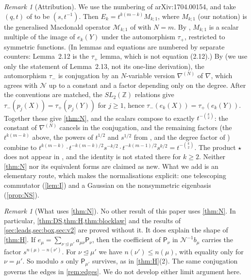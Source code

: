 \documentclass[11pt]{amsart}
\theoremstyle{definition}
\theoremstyle{remark}
\newtheorem{remark}[theorem]{Remark}
\numberwithin{equation}{section}
\begin{document}
\begin{remark}[Attribution]\label{rem:N-DFK}
We use the numbering of arXiv:1704.00154, and take $(q,t)$ of \cite{DFK19} to be $(s,t^{-1})$. Then $E_k=t^{k(m-k)}M_{k;1}$, where $M_{k;1}$ (our notation) is the generalised Macdonald operator $\mathcal M_{k;1}$ of \cite[(1.5)]{DFK19} with $N=m$. By \cite[Lemma~2.12, Lemma~2.16, Thm.~2.17]{DFK19}, $M_{k;1}$ is a scalar multiple of the image of $e_k(Y)$ under the automorphism $\tau_+$, restricted to symmetric functions. (In \cite{DFK19} lemmas and equations are numbered by separate counters: Lemma~2.12 is the $\tau_+$ lemma, which is not equation (2.12).) By \cite[Lemma~2.13, Rem.~2.14, (4.14)]{DFK19} (we use only the statement of Lemma~2.13, not its one-line derivation), the automorphism $\tau_-$ is conjugation by an $N$-variable version $\nabla^{(N)}$ of $\nabla$, which agrees with $\mathcal N$ up to a constant and a factor depending only on the degree. After the conventions are matched, the $SL_2(\mathbb{Z})$ relations \cite[(6.3), (6.5), (6.8)]{DFK19} give $\tau_-(p_j(X))=\tau_+(p_j(Y))$ for $j\ge1$, hence $\tau_-(e_k(X))=\tau_+(e_k(Y))$. Together these give \cref{thm:N}, and the scalars compose to exactly $t^{-\binom k2}$: the constant of $\nabla^{(N)}$ cancels in the conjugation, and the remaining factors (the $t^{k(m-k)}$ above, the powers of $t^{1/2}$ and $s^{1/2}$ from \cite[(2.11) in Thm.~2.17, Lemma~2.16]{DFK19}, and the degree factor of \cite[(4.14)]{DFK19}) combine to $t^{k(m-k)}\cdot t^{-k(m-k)/2}s^{-k/2}\cdot t^{-k(m-1)/2}s^{k/2}=t^{-\binom k2}$. The product $\star$ does not appear in \cite{DFK19}, and the identity is not stated there for $k\ge2$. Neither \cref{thm:N} nor its equivalent forms are claimed as new. What we add is an elementary route, which makes the normalisations explicit: one telescoping commutator (\cref{lem:I}) and a Gaussian on the nonsymmetric eigenbasis (\cref{prop:NS}).
\end{remark}

\begin{remark}[What uses \cref{thm:N}]\label{rem:N-uses}
No other result of this paper uses \cref{thm:N}. In particular, \cref{thm:DS,thm:H,thm:blocklaw} and the results of \cref{sec:leads,sec:box,sec:v2} are proved without it. It does explain the shape of \cref{thm:H}. If $e_\mu=\sum_{\nu\trianglelefteq\mu'}a_{\mu\nu}\mathsf P_\nu$, then the coefficient of $\mathsf P_\nu$ in $\mathcal N^{-1}b_\mu$ carries the factor $s^{n(\mu)-n(\nu')}$. For $\nu\trianglelefteq\mu'$ we have $n(\nu')\le n(\mu)$, with equality only for $\nu=\mu'$. So modulo $s$ only $\mathsf P_{\mu'}$ survives, as in \cref{thm:H}(2). The same conjugation governs the edges in \cref{rem:edges}. We do not develop either limit argument here.
\end{remark}
\end{document}
